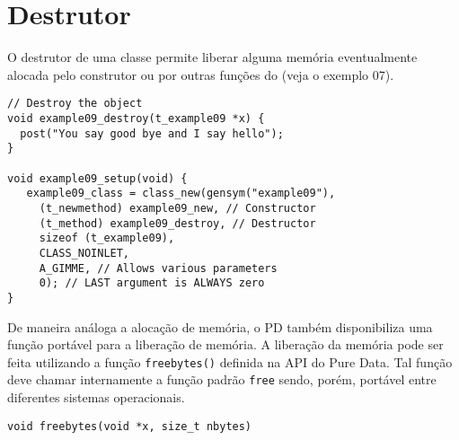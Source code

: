 \section{Destrutor}

O destrutor de uma classe permite liberar alguma memória eventualmente alocada
pelo construtor ou por outras funções do \external (veja o exemplo 07).

\begin{lstlisting}[caption=Exemplo de destrutor]
// Destroy the object
void example09_destroy(t_example09 *x) {
  post("You say good bye and I say hello");
}

void example09_setup(void) {
   example09_class = class_new(gensym("example09"),
     (t_newmethod) example09_new, // Constructor
     (t_method) example09_destroy, // Destructor
     sizeof (t_example09),
     CLASS_NOINLET,
     A_GIMME, // Allows various parameters
     0); // LAST argument is ALWAYS zero
}
\end{lstlisting}

De maneira análoga a alocação de memória, o PD também disponibiliza uma função
portável para a liberação de memória.
A liberação da memória pode ser feita utilizando a função \texttt{freebytes()}
definida na API do Pure Data.
Tal função deve chamar internamente a função padrão \texttt{free} sendo, porém,
portável entre diferentes sistemas operacionais.

\begin{lstlisting}
void freebytes(void *x, size_t nbytes)
\end{lstlisting}
